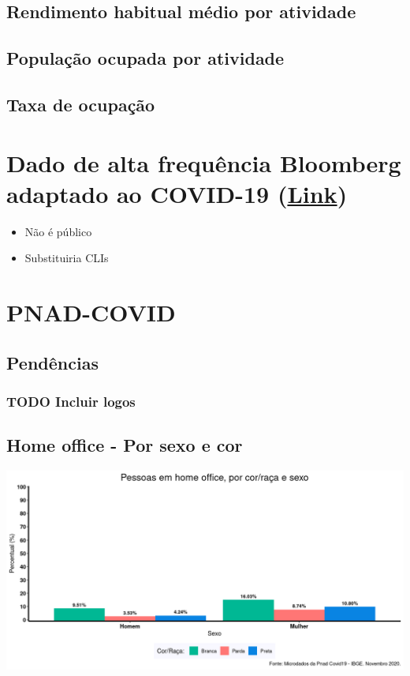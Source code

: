 \documentclass{SelfArx}
\begin{document}
\subsection*{Rendimento habitual médio por atividade}
\label{sec:orga786f15}

\subsection*{População ocupada por atividade}
\label{sec:org066f913}



\subsection*{Taxa de ocupação}
\label{sec:orgf000079}


\section*{Dado de alta frequência Bloomberg adaptado ao COVID-19 (\href{https://www.bloomberg.com/news/articles/2020-11-13/alternative-data-show-activity-crashes-as-virus-resurges-chart}{Link})}
\label{sec:orgcfe4d21}

\begin{itemize}
\item Não é público
\item Substituiria CLIs
\end{itemize}

\section*{PNAD-COVID}
\label{sec:orgebecf7f}
\subsection*{Pendências}
\label{sec:org382a9eb}
\subsubsection*{{\bfseries\sffamily TODO} Incluir logos}
\label{sec:org1a47050}
\subsection*{Home office - Por sexo e cor}
\label{sec:org998e8db}
\begin{center}
\includegraphics[width=.9\linewidth]{./figs/PNAD_COVID/home_sexo_cor.png}
\end{center}
\end{document}
